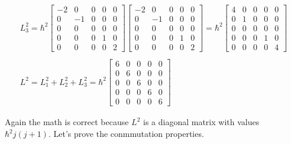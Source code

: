 \begin{equation}
\begin{array}{c}
    \\
    L_3^2 = \hbar^2\left[\begin{matrix}
      -2 & 0 & 0 & 0 & 0\\
      0 & -1 & 0 & 0 & 0\\
      0 & 0 & 0 & 0 & 0\\
      0 & 0 & 0 & 1 & 0\\
      0 & 0 & 0 & 0 & 2
    \end{matrix}\right]\left[\begin{matrix}
      -2 & 0 & 0 & 0 & 0\\
      0 & -1 & 0 & 0 & 0\\
      0 & 0 & 0 & 0 & 0\\
      0 & 0 & 0 & 1 & 0\\
      0 & 0 & 0 & 0 & 2
    \end{matrix}\right] =
    \hbar^2\left[\begin{matrix}
      4 & 0 & 0 & 0 & 0\\
      0 & 1 & 0 & 0 & 0\\
      0 & 0 & 0 & 0 & 0\\
      0 & 0 & 0 & 1 & 0\\
      0 & 0 & 0 & 0 & 4
    \end{matrix}\right]
    \\

    \\
    L^2 = L_1^2+L_2^2+L_3^2 = \hbar^2 \left[\begin{matrix}
      6 & 0 & 0 & 0 & 0\\
      0 & 6 & 0 & 0 & 0\\
      0 & 0 & 6 & 0 & 0\\
      0 & 0 & 0 & 6 & 0\\
      0 & 0 & 0 & 0 & 6
    \end{matrix}\right]
  \end{array}
\end{equation}

Again the math is correct because $L^2$ is a diagonal matrix with values $\hbar^2j(j+1)$. Let's prove the conmmutation properties.

